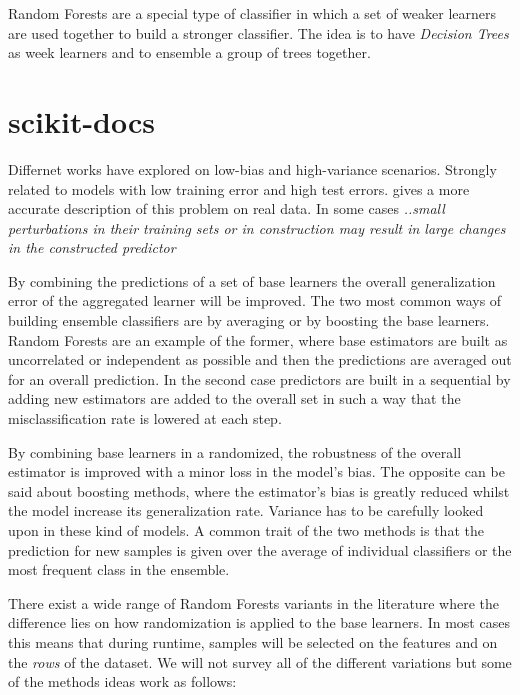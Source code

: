 Random Forests are a special type of classifier in which a set of weaker learners are used together to build a stronger classifier. The idea is to have \textit{Decision Trees} as week learners and to ensemble a group of trees together.
	
\section{scikit-docs}

Differnet works have explored on low-bias and high-variance scenarios. Strongly related to models with low training error and high test errors.  \cite{breiman-arcingclassifiers} gives a more accurate description of this problem on real data. In some cases \textit{..small perturbations in their  training  sets  or  in  construction  may  result  in  large  changes  in  the  constructed  predictor}
	
	
	
	By combining the predictions of a set of base learners the overall generalization error of the aggregated learner will be improved. The two most common ways of building ensemble classifiers are by averaging or by boosting the base learners. Random Forests are an example of the former, where base estimators are built as uncorrelated or independent as possible and then the predictions are averaged out for an overall prediction. In the second case predictors are built in a sequential by adding new estimators are added to the overall set in such a way that the misclassification rate is lowered at each step.
	
	By combining base learners in a randomized, the robustness of the overall estimator is improved with a minor loss in the model's bias. The opposite can be said about boosting methods, where the estimator's bias is greatly reduced whilst the model increase its generalization rate. Variance has to be carefully looked upon in these kind of models. A common trait of the two methods is that the prediction for new samples is given over the average of individual classifiers or the most frequent class in the ensemble. 
	
	There exist a wide range of Random Forests variants in the literature \cite{breiman-randomforests} where the difference lies on how randomization is applied to the base learners. In most cases this means that during runtime, samples will be selected on the features and on the \textit{rows} of the dataset. We will not survey all of the different variations but some of the methods ideas work as follows:
	
